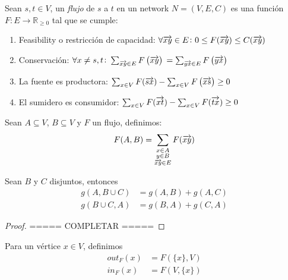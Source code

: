 \begin{definition}
  Sean $s,t \in V$, un \emph{flujo} de $s$ a $t$ en un network $N = (V, E, C)$
  es una función $F \colon E \to \mathbb{R}_{\ge 0}$ tal que se cumple:
  \begin{enumerate}
  \item Feasibility o restricción de capacidad: \label{feasible}
    $\forall \overrightarrow{xy} \in E \colon 0 \le F(\overrightarrow{xy}) \le C(\overrightarrow{xy})$

  \item Conservación: \label{conservacion}
    $\forall x \neq s,t \colon \sum_{\substack{\overrightarrow{xy} \in E}} F\left(\overrightarrow{xy}\right)$
    $= \sum_{\substack{\overrightarrow{yx} \in E}} F\left(\overrightarrow{yx}\right)$

  \item La fuente es productora: \label{fuente}
    $\sum_{x \in V} F(\overrightarrow{sx}) - \sum_{x \in V} F\left(\overrightarrow{xs}\right) \ge 0$

  \item El sumidero es consumidor: \label{sumidero}
    $\sum_{x \in V} F(\overrightarrow{xt}) - \sum_{x \in V} F(\overrightarrow{tx}) \ge 0$
  \end{enumerate}
\end{definition}

\begin{definition}
Sean $A \subseteq V$, $B \subseteq V$ y $F$ un flujo, definimos:
\begin{align}
  F(A, B) = \sum_{\substack{x \in A \\ y \in B \\ \overrightarrow{xy} \in E}} F(\overrightarrow{xy})
\end{align}
\end{definition}

\begin{proposition}
  Sean $B$ y $C$ disjuntos, entonces
\begin{align}
  g(A, B \cup C) &= g(A,B) + g(A,C)\\
  g(B \cup C, A) &= g(B,A) + g(C,A)    
\end{align}
\end{proposition}

\begin{proof}
  ===== COMPLETAR =====
\end{proof}

\begin{definition}\label{in/out}
  Para un vértice $x \in V$, definimos
\begin{align}
  out_{F}(x) &= F(\{x\}, V)\\
  in_{F}(x) &= F(V, \{x\})
\end{align}
\end{definition}

